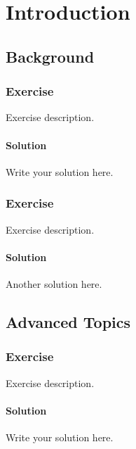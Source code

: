 \section{Introduction}

\subsection{Background}

\subsubsection*{Exercise}
Exercise description.
\paragraph{Solution}
Write your solution here.

\subsubsection*{Exercise}
Exercise description.
\paragraph{Solution}
Another solution here.

\subsection{Advanced Topics}

\subsubsection*{Exercise}
Exercise description.
\paragraph{Solution}
Write your solution here.
